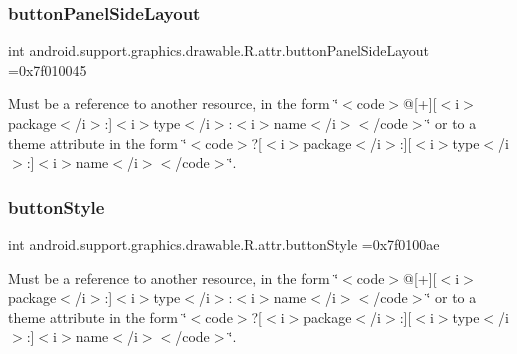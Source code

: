 \subsubsection{\texorpdfstring{button\+Panel\+Side\+Layout}{buttonPanelSideLayout}}
{\footnotesize\ttfamily int android.\+support.\+graphics.\+drawable.\+R.\+attr.\+button\+Panel\+Side\+Layout =0x7f010045\hspace{0.3cm}{\ttfamily [static]}}

Must be a reference to another resource, in the form \char`\"{}$<$code$>$@\mbox{[}+\mbox{]}\mbox{[}$<$i$>$package$<$/i$>$\+:\mbox{]}$<$i$>$type$<$/i$>$\+:$<$i$>$name$<$/i$>$$<$/code$>$\char`\"{} or to a theme attribute in the form \char`\"{}$<$code$>$?\mbox{[}$<$i$>$package$<$/i$>$\+:\mbox{]}\mbox{[}$<$i$>$type$<$/i$>$\+:\mbox{]}$<$i$>$name$<$/i$>$$<$/code$>$\char`\"{}. \mbox{\label{classandroid_1_1support_1_1graphics_1_1drawable_1_1R_1_1attr_a13a6bfae7efa06b925920bc78ad38ee0}} 
\subsubsection{\texorpdfstring{button\+Style}{buttonStyle}}
{\footnotesize\ttfamily int android.\+support.\+graphics.\+drawable.\+R.\+attr.\+button\+Style =0x7f0100ae\hspace{0.3cm}{\ttfamily [static]}}

Must be a reference to another resource, in the form \char`\"{}$<$code$>$@\mbox{[}+\mbox{]}\mbox{[}$<$i$>$package$<$/i$>$\+:\mbox{]}$<$i$>$type$<$/i$>$\+:$<$i$>$name$<$/i$>$$<$/code$>$\char`\"{} or to a theme attribute in the form \char`\"{}$<$code$>$?\mbox{[}$<$i$>$package$<$/i$>$\+:\mbox{]}\mbox{[}$<$i$>$type$<$/i$>$\+:\mbox{]}$<$i$>$name$<$/i$>$$<$/code$>$\char`\"{}. \mbox{\label{classandroid_1_1support_1_1graphics_1_1drawable_1_1R_1_1attr_a7ee5f2b51ffd5c244c8e0fd897a25a37}} 
